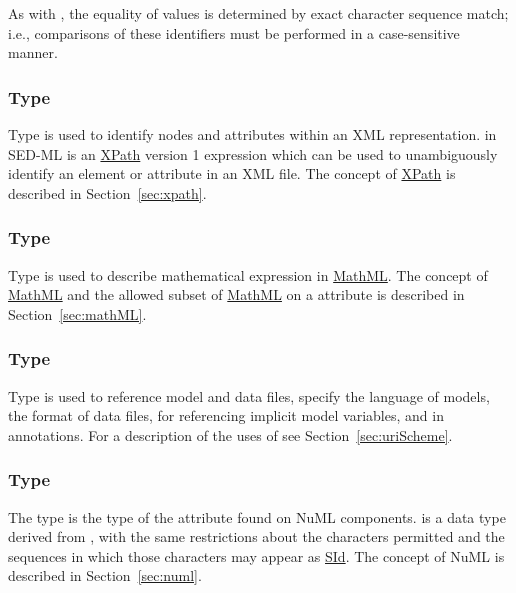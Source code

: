As with \hyperref[type:sid]{}, the equality of  values is determined by exact character sequence match; i.e., comparisons of these identifiers must be performed in a case-sensitive manner.

\subsubsection[\element{XPath}]{Type }
\label{type:xpath}
Type  is used to identify nodes and attributes within an XML representation.  in SED-ML is an \hyperref[sec:xpath]{XPath} version 1 expression which can be used to unambiguously identify an element or attribute in an XML file. The concept of \hyperref[sec:xpath]{XPath} is described in Section~\ref{sec:xpath}.

\subsubsection[\element{MathML}]{Type }
\label{type:mathml}
Type  is used to describe mathematical expression in \hyperref[sec:mathML]{MathML}. The concept of \hyperref[sec:mathML]{MathML} and the allowed subset of \hyperref[sec:mathML]{MathML} on a  attribute is described in Section~\ref{sec:mathML}.

\subsubsection[\element{anyURI}]{Type }
\label{type:anyURI}
Type  is used to reference model and data files, specify the language of models, the format of data files, for referencing implicit model variables, and in annotations. For a description of the uses of  see Section~\ref{sec:uriScheme}.

\subsubsection[\element{NuMLSId}]{Type }
\label{type:numlsid}
The type  is the type of the  attribute found on NuML components.  is a data type derived from \hyperref[type:sid]{}, with the same restrictions about the characters permitted and the sequences in which those characters may appear as \hyperref[type:sid]{SId}. The concept of NuML is described in Section~\ref{sec:numl}.

